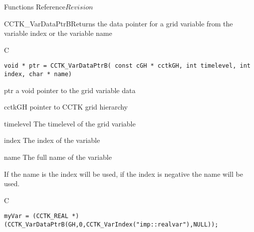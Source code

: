 \begin{cactuspart}{ Functions Reference}{}{$Revision$}
\begin{FunctionDescription}{CCTK\_VarDataPtrB}{Returns the data pointer for a grid variable from the variable index or the variable name}
\label{CCTK-VarDataPtrB}
\begin{SynopsisSection}
\begin{Synopsis}{C}
\begin{verbatim}void * ptr = CCTK_VarDataPtrB( const cGH * cctkGH, int timelevel, int index, char * name)\end{verbatim}
\end{Synopsis}
\end{SynopsisSection}
\begin{ParameterSection}
\begin{Parameter}{ptr}
a void pointer to the grid variable data
\end{Parameter}
\begin{Parameter}{cctkGH}
pointer to CCTK grid hierarchy
\end{Parameter}
\begin{Parameter}{timelevel}
The timelevel of the grid variable
\end{Parameter}
\begin{Parameter}{index}
The index of the variable
\end{Parameter}
\begin{Parameter}{name}
The full name of the variable
\end{Parameter}
\end{ParameterSection}
\begin{Discussion}
If the name is  the index will be used, if the index is negative the name will be used.
\end{Discussion}
\begin{ExampleSection}
\begin{Example}{C}
\begin{verbatim}
myVar = (CCTK_REAL *)(CCTK_VarDataPtrB(GH,0,CCTK_VarIndex("imp::realvar"),NULL));
\end{verbatim}
\end{Example}
\end{ExampleSection}
\end{FunctionDescription}



\end{cactuspart}
